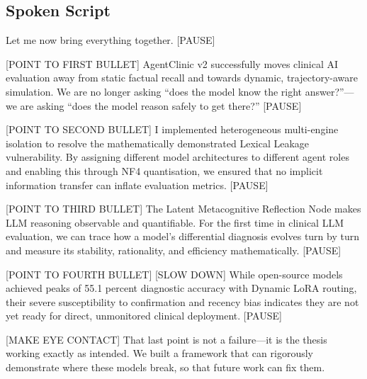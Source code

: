 \documentclass[12pt]{article}
\begin{document}
  \subsection*{Spoken Script}
  \begin{spokenbox}
   Let me now bring everything together. [PAUSE]

  [POINT TO FIRST BULLET] AgentClinic v2 successfully moves clinical AI evaluation away from static factual recall and towards dynamic, trajectory-aware simulation. We are no longer asking ``does the model know the right answer?''---we are asking ``does the model reason safely to get there?'' [PAUSE]

  [POINT TO SECOND BULLET] I implemented heterogeneous multi-engine isolation to resolve the mathematically demonstrated Lexical Leakage vulnerability. By assigning different model architectures to different agent roles and enabling this through NF4 quantisation, we ensured that no implicit information transfer can inflate evaluation metrics. [PAUSE]

  [POINT TO THIRD BULLET] The Latent Metacognitive Reflection Node makes LLM reasoning observable and quantifiable. For the first time in clinical LLM evaluation, we can trace how a model's differential diagnosis evolves turn by turn and measure its stability, rationality, and efficiency mathematically. [PAUSE]

  [POINT TO FOURTH BULLET] [SLOW DOWN] While open-source models achieved peaks of 55.1 percent diagnostic accuracy with Dynamic LoRA routing, their severe susceptibility to confirmation and recency bias indicates they are not yet ready for direct, unmonitored clinical deployment. [PAUSE]

  [MAKE EYE CONTACT] That last point is not a failure---it is the thesis working exactly as intended. We built a framework that can rigorously demonstrate where these models break, so that future work can fix them.
  \end{spokenbox}
\end{document}
